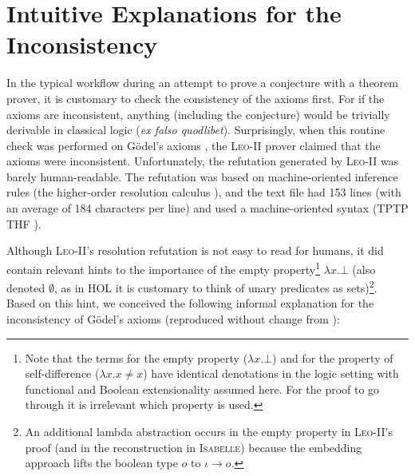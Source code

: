 \documentclass{llncs}
\newcommand{\imp}{{\rightarrow}}
\begin{document}
\section{Intuitive Explanations for the Inconsistency} 
\label{sec:inconsistency}

In the typical workflow during an attempt to prove a conjecture with a
theorem prover, it is customary to check the consistency of the axioms
first. For if the axioms are inconsistent, anything (including the
conjecture) would be trivially derivable in classical logic (\emph{ex
  falso quodlibet}). Surprisingly, when this routine check was
performed on G\"odel's axioms \cite{C40}, the \textsc{Leo-II} prover
claimed that the axioms were inconsistent. Unfortunately, the
refutation generated by \textsc{Leo-II} was barely human-readable. The refutation was based on machine-oriented inference rules (the higher-order resolution calculus \cite{W47}), and the
text file had 153 lines (with an average of 184
  characters per line) and used a machine-oriented syntax (TPTP THF
\cite{J22}). 


Although \textsc{Leo-II}'s resolution refutation is not easy to read
for humans, it did contain relevant hints to the importance of the
empty property\footnote{
  Note that the terms for the empty property ($\lambda x. \bot$) and for the property of self-difference ($\lambda x.  x\not=x$) have identical denotations in the logic setting
  with functional and Boolean extensionality assumed
  here. 
  For the proof to go through it is
  irrelevant which property is used.
} $\lambda x. \bot$ (also denoted $\emptyset$, as in HOL it is customary to think of unary predicates as sets)\footnote{An additional lambda abstraction occurs in the empty property in \textsc{Leo-II}'s proof (and in the reconstruction in \textsc{Isabelle}) because the embedding approach lifts the boolean type $o$ to $\iota \imp o$.}. Based on this hint, we conceived the following informal explanation for the inconsistency of G\"odel's axioms (reproduced without change from \cite{C55}):
%
\end{document}

